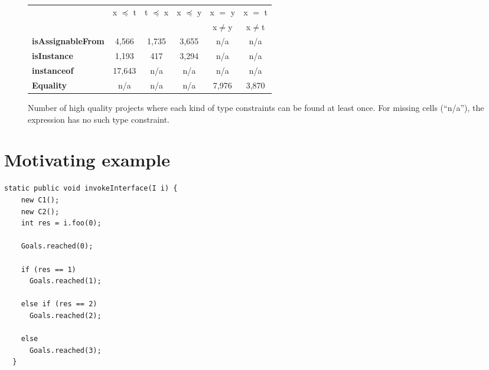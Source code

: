 \begin{figure*}[tb]
\begin{center}
\begin{small}
\begin{tabular}{|l|c|c|c|c|c|}
\hline
& \multirow{2}{*}{x $\preceq$ t} &\multirow{2}{*}{t $\preceq$ x}& \multirow{2}{*}{x $\preceq$  y }& x $=$ y & x $=$ t
\\&&&&x$\neq$y&x$\neq$t\\
\hline
\hline
\textbf{isAssignableFrom} & 4,566 & 1,735 & 3,655 & n/a &n/a\\
\textbf{isInstance}&1,193 &417&3,294&n/a&n/a\\
\textbf{instanceof} &17,643&n/a&n/a&n/a&n/a\\
\textbf{Equality}&n/a&n/a&n/a &7,976&3,870 \\
\hline
\end{tabular}
\end{small}
\end{center}
\caption{Number of high quality projects where each kind of type constraints can be found at least once.  For missing cells (``n/a''), the expression has no such type constraint. }
\label{fig:projectnumber_quality}
\end{figure*}

\section{Motivating example}

\begin{lstlisting}[style=JavaStyle, caption=An example Java program, label=lst:motivation]
static public void invokeInterface(I i) {
    new C1();
    new C2();
    int res = i.foo(0); 
    
    Goals.reached(0);
    
    if (res == 1)
      Goals.reached(1);

    else if (res == 2)
      Goals.reached(2);
    
    else
      Goals.reached(3);   
  }

\end{lstlisting}